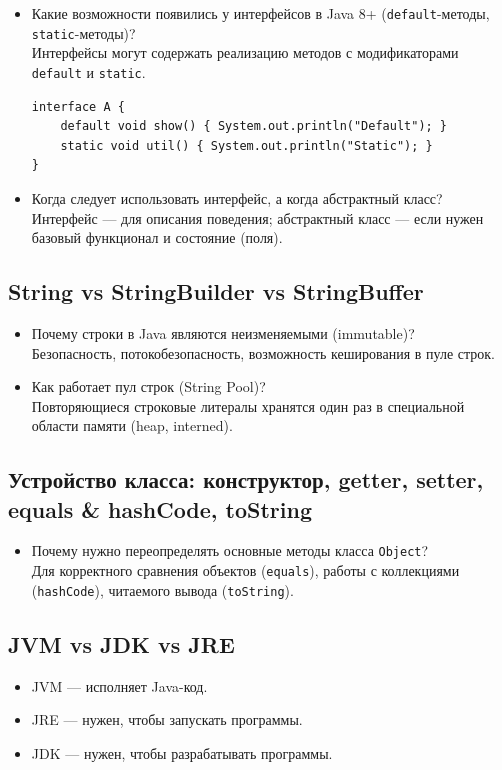 \documentclass[a4paper,14pt]{article}
\begin{document}
\begin{itemize}
    \item Какие возможности появились у интерфейсов в Java 8+ (\texttt{default}-методы, \texttt{static}-методы)? \\
    Интерфейсы могут содержать реализацию методов с модификаторами \texttt{default} и \texttt{static}.
    \begin{lstlisting}[style=javastyle]
interface A {
    default void show() { System.out.println("Default"); }
    static void util() { System.out.println("Static"); }
}
    \end{lstlisting}
    \item Когда следует использовать интерфейс, а когда абстрактный класс? \\
    Интерфейс — для описания поведения; абстрактный класс — если нужен базовый функционал и состояние (поля).
\end{itemize}

\subsection{String vs StringBuilder vs StringBuffer}

\begin{itemize}
    \item Почему строки в Java являются неизменяемыми (immutable)? \\
    Безопасность, потокобезопасность, возможность кеширования в пуле строк.
    \item Как работает пул строк (String Pool)? \\
    Повторяющиеся строковые литералы хранятся один раз в специальной области памяти (heap, interned).
\end{itemize}

\subsection{Устройство класса: конструктор, getter, setter, equals \& hashCode, toString}

\begin{itemize}
    \item Почему нужно переопределять основные методы класса \texttt{Object}? \\
    Для корректного сравнения объектов (\texttt{equals}), работы с коллекциями (\texttt{hashCode}), читаемого вывода (\texttt{toString}).
\end{itemize}

\subsection{JVM vs JDK vs JRE}
\begin{itemize}
    \item JVM — исполняет Java-код.
    \item JRE — нужен, чтобы запускать программы.
    \item JDK — нужен, чтобы разрабатывать программы.
\end{itemize}
\end{document}
